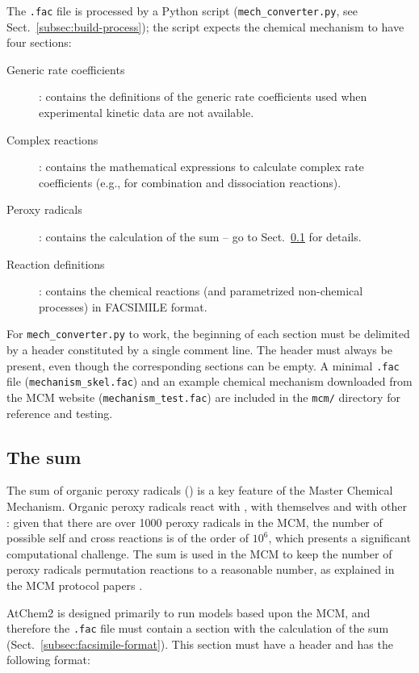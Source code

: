The \texttt{.fac} file is processed by a Python script
(\texttt{mech\_converter.py}, see Sect.~\ref{subsec:build-process});
the script expects the chemical mechanism to have four sections:

\begin{description}
\item[Generic rate coefficients] : contains the definitions of the
  generic rate coefficients used when experimental kinetic data are
  not available.
\item[Complex reactions] : contains the mathematical expressions to
  calculate complex rate coefficients (e.g., for combination and
  dissociation reactions).
\item[Peroxy radicals] : contains the calculation of the  sum
  -- go to Sect.~\ref{subsec:ro2-sum} for details.
\item[Reaction definitions] : contains the chemical reactions (and
  parametrized non-chemical processes) in FACSIMILE format.
\end{description}

For \texttt{mech\_converter.py} to work, the beginning of each section
must be delimited by a header constituted by a single comment line.
The header must always be present, even though the corresponding
sections can be empty. A minimal \texttt{.fac} file
(\texttt{mechanism\_skel.fac}) and an example chemical mechanism
downloaded from the MCM website (\texttt{mechanism\_test.fac}) are
included in the \texttt{mcm/} directory for reference and testing.

\subsection{The  sum} \label{subsec:ro2-sum}

The sum of organic peroxy radicals () is a key feature of the
Master Chemical Mechanism. Organic peroxy radicals react with
, with themselves and with other : given that there
are over 1000 peroxy radicals in the MCM, the number of possible self
and cross reactions is of the order of $10^6$, which presents a
significant computational challenge. The  sum is used in the
MCM to keep the number of peroxy radicals permutation reactions to a
reasonable number, as explained in the MCM protocol papers
\citep{jenkin_1997, saunders_2003}.

AtChem2 is designed primarily to run models based upon the MCM, and
therefore the \texttt{.fac} file must contain a section with the
calculation of the  sum (Sect.~\ref{subsec:facsimile-format}).
This section must have a header and has the following format:

